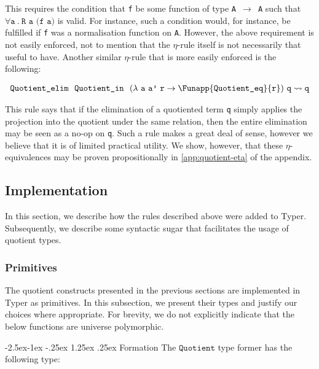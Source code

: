 \documentclass[12pt,twoside,maitrise]{dms}
\makeatletter
\theoremstyle{definition}
\numberwithin{equation}{section}
\numberwithin{table}{chapter}
\numberwithin{figure}{chapter}
\newcommand\id[1] {\texttt{#1}}
\newcommand\fn[1] {\texttt{#1}}
\renewcommand\paragraph{\@startsection{paragraph}{4}{\z@}%
            {-2.5ex\@plus -1ex \@minus -.25ex}%
            {1.25ex \@plus .25ex}%
            {\normalfont\normalsize\bfseries}}
\makeatother
\begin{document}
This requires the condition that \id{f} be some function of type \fn{A
  $\rightarrow$ A} such that $\forall \id{a} \ . \ \fn{R a (f a)}$ is valid. For
instance, such a condition would, for instance, be fulfilled if \id{f} was a
normalisation function on \id{A}. However, the above requirement is not easily
enforced, not to mention that the $\eta$-rule itself is not necessarily that
useful to have. Another similar $\eta$-rule that is more easily enforced is the
following:

\begin{align*}
  & \fn{Quotient\_elim} \ \  \id{Quotient\_in} \ \ (\lambda \ \id{a} \ \id{a'} \ \id{r} \rightarrow \Funapp{\id{Quotient\_eq}}{\id{r}}) \ \id{q} \rightsquigarrow{} \id{q} \\
\end{align*}

This rule says that if the elimination of a quotiented term \id{q} simply
applies the projection into the quotient under the same relation, then the
entire elimination may be seen as a no-op on \id{q}. Such a rule makes a great
deal of sense, however we believe that it is of limited practical utility. We
show, however, that these $\eta$-equivalences may be proven propositionally in
\autoref{app:quotient-eta} of the appendix.

\subsection{Implementation}

In this section, we describe how the rules described above were added to Typer.
Subsequently, we describe some syntactic sugar that facilitates the usage of
quotient types.

\subsubsection{Primitives}

The quotient constructs presented in the previous sections are implemented in
Typer as primitives. In this subsection, we present their types and justify our
choices where appropriate. For brevity, we do not explicitly indicate that the
below functions are universe polymorphic.

\paragraph{Formation}
The $\id{Quotient}$ type former has the following type:
\end{document}
